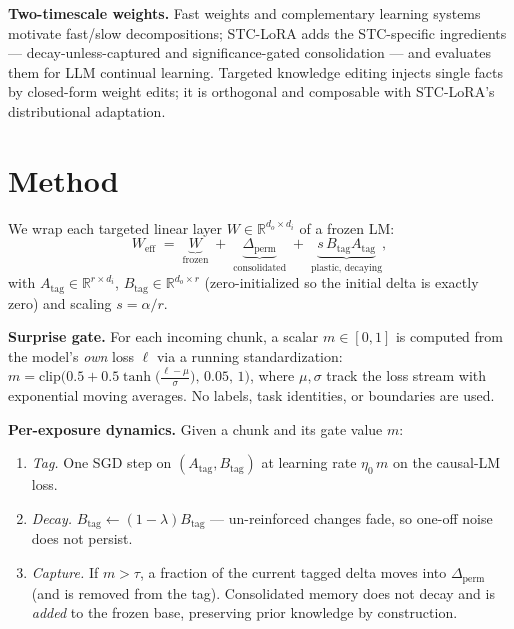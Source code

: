 \documentclass{article}
\newcommand{\stc}{STC-LoRA}
\begin{document}
\textbf{Two-timescale weights.} Fast weights \citep{ba2016using} and complementary learning systems \citep{mcclelland1995there} motivate fast/slow decompositions; \stc{} adds the STC-specific ingredients --- decay-unless-captured and significance-gated consolidation --- and evaluates them for LLM continual learning. Targeted knowledge editing \citep{meng2022locating} injects single facts by closed-form weight edits; it is orthogonal and composable with \stc{}'s distributional adaptation.

\section{Method}\label{sec:method}
We wrap each targeted linear layer $W\in\mathbb{R}^{d_o\times d_i}$ of a frozen LM:
\begin{equation}
W_{\mathrm{eff}} \;=\; \underbrace{W}_{\text{frozen}} \;+\; \underbrace{\Delta_{\mathrm{perm}}}_{\text{consolidated}} \;+\; \underbrace{s\,B_{\mathrm{tag}}A_{\mathrm{tag}}}_{\text{plastic, decaying}},
\end{equation}
with $A_{\mathrm{tag}}\in\mathbb{R}^{r\times d_i}$, $B_{\mathrm{tag}}\in\mathbb{R}^{d_o\times r}$ (zero-initialized so the initial delta is exactly zero) and scaling $s=\alpha/r$.

\textbf{Surprise gate.} For each incoming chunk, a scalar $m\in[0,1]$ is computed from the model's \emph{own} loss $\ell$ via a running standardization: $m = \mathrm{clip}\!\big(0.5 + 0.5\tanh\!\big(\tfrac{\ell-\mu}{\sigma}\big),\,0.05,\,1\big)$, where $\mu,\sigma$ track the loss stream with exponential moving averages. No labels, task identities, or boundaries are used.

\textbf{Per-exposure dynamics.} Given a chunk and its gate value $m$:
\begin{enumerate}
  \item \emph{Tag.} One SGD step on $(A_{\mathrm{tag}},B_{\mathrm{tag}})$ at learning rate $\eta_0\, m$ on the causal-LM loss.
  \item \emph{Decay.} $B_{\mathrm{tag}}\!\leftarrow\!(1-\lambda)B_{\mathrm{tag}}$ --- un-reinforced changes fade, so one-off noise does not persist.
  \item \emph{Capture.} If $m>\tau$, a fraction of the current tagged delta moves into $\Delta_{\mathrm{perm}}$ (and is removed from the tag). Consolidated memory does not decay and is \emph{added} to the frozen base, preserving prior knowledge by construction.
\end{enumerate}
\end{document}
